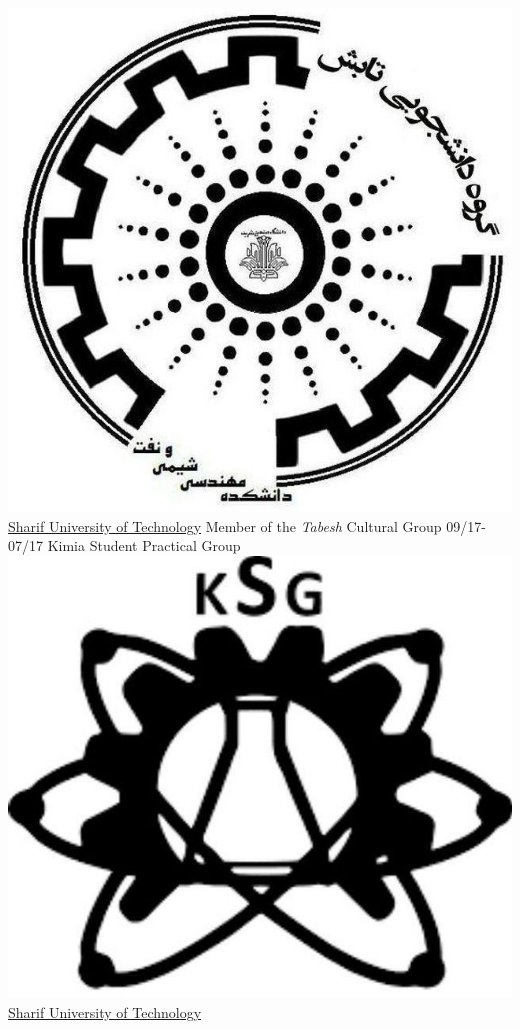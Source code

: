 \documentclass[a4paper]{friggeri-cv}
\begin{document}
\begin{entrylist}
        {\href{http://www.sharif.ir/}{\includegraphics[scale=0.03]{../assets/images/logos/Tabesh_logo.jpg} Sharif University of Technology}}
        {Member of the \emph{Tabesh} Cultural Group}
        \entry
        {09/17-07/17}
        {   Kimia Student Practical Group}
        {\href{http://www.sharif.ir/}{\includegraphics[scale=0.03]{../assets/images/logos/Kimia_logo.jpg} Sharif University of Technology}}

\end{entrylist}
\end{document}
